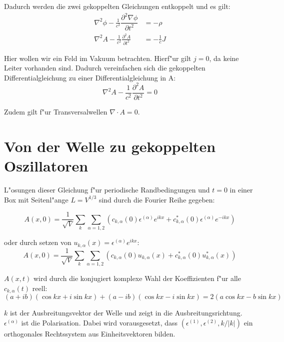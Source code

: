 Dadurch werden die zwei gekoppelten Gleichungen entkoppelt und es gilt:
\begin{equation}
\begin{split}
\nabla^2 \phi - \frac{1}{c^2} \dfrac{\partial^2 \nabla \phi}{\partial t^2} &= -\rho \\
\nabla^2 A - \frac{1}{c^2} \frac{\partial^2 A }{\partial t^2} &= - \frac{1}{c} J
\end{split}
\end{equation}

Hier wollen wir ein Feld im Vakuum betrachten. Hierf"ur gilt $j = 0$, da keine Leiter vorhanden sind.
Dadurch vereinfachen sich die gekoppelten Differentialgleichung zu einer Differentialgleichung in A:
\begin{equation} \label{fq:wave_dgl}
\nabla^2 A - \frac{1}{c^2} \frac{\partial^2 A }{\partial t^2} = 0
\end{equation}

Zudem gilt f"ur Transversalwellen $\nabla \cdot A = 0$.

\section{Von der Welle zu gekoppelten Oszillatoren}
L"osungen dieser Gleichung f"ur periodische Randbedingungen und $t=0$ in einer Box mit Seitenl"ange $L = V^{1/3}$ sind durch die Fourier Reihe gegeben:

\begin{equation}
A(x,0) = \frac{1}{\sqrt{V}} \sum_k \sum_{\alpha=1,2} (c_{k,\alpha}(0) \epsilon^{(\alpha)} e^{ikx} + c^*_{k,\alpha}(0) \epsilon^{(\alpha)} e^{-ikx})
\end{equation}

oder durch setzen von $u_{k,\alpha}(x) = \epsilon^{(\alpha)} e^{ikx}$:
\begin{equation}
A(x,0) = \frac{1}{\sqrt{V}} \sum_k \sum_{\alpha=1,2} (c_{k,\alpha}(0)u_{k,\alpha}(x) + c^*_{k,\alpha}(0) u^*_{k,\alpha}(x))
\end{equation}

$A(x,t)$ wird durch die konjugiert komplexe Wahl der Koeffizienten f"ur alle $c_{k,\alpha}(t)$ reell:
\begin{equation}
(a + ib)(\cos kx + i \sin kx ) + (a - ib)(\cos kx - i \sin kx ) = 2 ( a \cos kx - b \sin kx )
\end{equation}

$k$ ist der Ausbreitungsvektor der Welle und zeigt in die Ausbreitungsrichtung. $\epsilon^{(\alpha)}$ ist die Polarisation. Dabei wird vorausgesetzt, dass $(\epsilon^{(1)}, \epsilon^{(2)} , k/|k|)$ ein orthogonales Rechtssystem aus Einheitsvektoren bilden.

